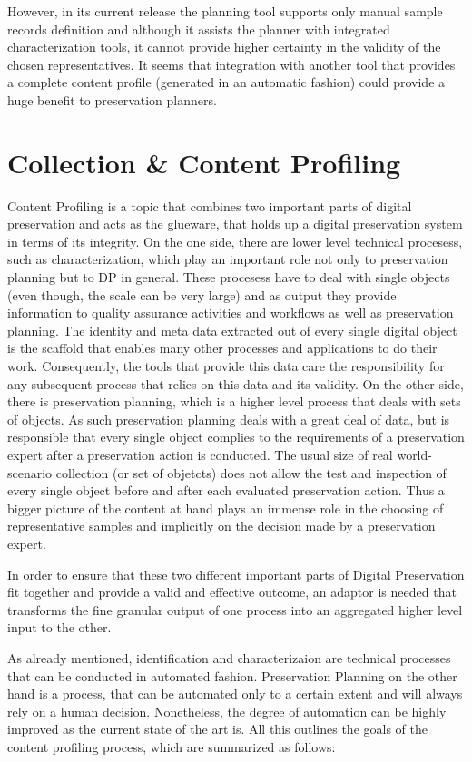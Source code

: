 However, in its current release the planning tool supports only manual sample records definition and although it assists the planner with integrated characterization tools, it cannot provide higher certainty in the validity of the chosen representatives. It seems that integration with another tool that provides a complete content profile (generated in an automatic fashion) could provide a huge benefit to preservation planners.

\section{Collection \& Content Profiling}
Content Profiling is a topic that combines two important parts of digital preservation and acts as the glueware, that holds up a digital preservation system in terms of its integrity. On the one side, there are lower level technical procesess, such as characterization, which play an important role not only to preservation planning but to DP in general. These procesess have to deal with single objects (even though, the scale can be very large) and as output they provide information to quality assurance activities and workflows as well as preservation planning. The identity and meta data extracted out of every single digital object is the scaffold that enables many other processes and applications to do their work. Consequently, the tools that provide this data care the responsibility for any subsequent process that relies on this data and its validity.
On the other side, there is preservation planning, which is a higher level process that deals with sets of objects. As such preservation planning deals with a great deal of data, but is responsible that every single object complies to the requirements of a preservation expert after a preservation action is conducted. The usual size of real world-scenario collection (or set of objetcts) does not allow the test and inspection of every single object before and after each evaluated preservation action. Thus a bigger picture of the content at hand plays an immense role in the choosing of representative samples and implicitly on the decision made by a preservation expert.

In order to ensure that these two different important parts of Digital Preservation fit together and provide a valid and effective outcome, an adaptor is needed that transforms the fine granular output of one process into an aggregated higher level input to the other.

As already mentioned, identification and characterizaion are technical processes that can be conducted in automated fashion. Preservation Planning on the other hand is a process, that can be automated only to a certain extent and will always rely on a human decision. Nonetheless, the degree of automation can be highly improved as the current state of the art is. All this outlines the goals of the content profiling process, which are summarized as follows:

